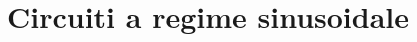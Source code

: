 \documentclass[../main.tex]{subfiles}
\begin{document}
\clearpage
\thispagestyle{empty}
\vspace*{7cm}
\section{Circuiti a regime sinusoidale}
\vspace*{1.5cm}
\end{document}
